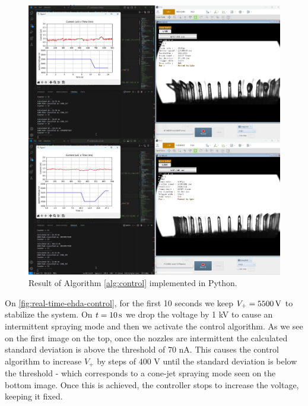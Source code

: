 \documentclass[oneside,12pt]{article}
\begin{document}
\begin{figure}[h!]
    \centering
    \includegraphics[width=\textwidth,trim=1 1 1 1,clip]{figures/real-time-ehda-control.png}
    \caption{Result of Algorithm \ref{alg:control} implemented in Python.}
    \label{fig:real-time-ehda-control}
\end{figure}

On \autoref{fig:real-time-ehda-control}, for the first 10 seconds we keep $V_+ = 5500 \,\mathrm{V}$ to stabilize the system.
On $t = 10 \,\mathrm{s}$ we drop the voltage by 1 kV to cause an intermittent spraying mode and then we activate the control algorithm. 
As we see on the first image on the top, once the nozzles are intermittent the calculated standard deviation is above the threshold of
70 nA. This causes the control algorithm to increase $V_+$ by steps of 400 V until the standard deviation is below the threshold - which
corresponds to a cone-jet spraying mode seen on the bottom image.
Once this is achieved, the controller stops to increase the voltage, keeping it fixed.  

\end{document}
